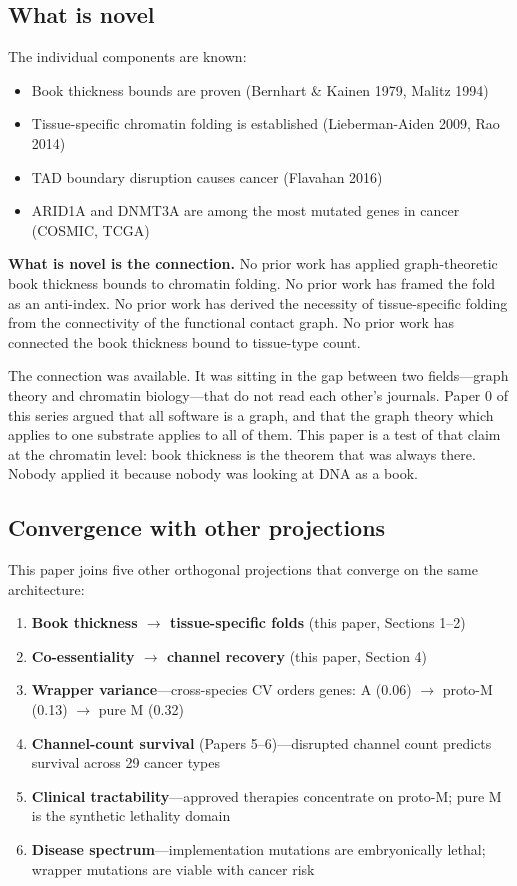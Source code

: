 \documentclass[11pt]{article}
\theoremstyle{definition}
\begin{document}
\subsection{What is novel}

The individual components are known:
\begin{itemize}[nosep]
\item Book thickness bounds are proven (Bernhart \& Kainen 1979, Malitz 1994)
\item Tissue-specific chromatin folding is established (Lieberman-Aiden 2009, Rao 2014)
\item TAD boundary disruption causes cancer (Flavahan 2016)
\item ARID1A and DNMT3A are among the most mutated genes in cancer (COSMIC, TCGA)
\end{itemize}

\textbf{What is novel is the connection.} No prior work has applied graph-theoretic book thickness bounds to chromatin folding. No prior work has framed the fold as an anti-index. No prior work has derived the necessity of tissue-specific folding from the connectivity of the functional contact graph. No prior work has connected the book thickness bound to tissue-type count.

The connection was available. It was sitting in the gap between two fields---graph theory and chromatin biology---that do not read each other's journals. Paper 0 of this series argued that all software is a graph, and that the graph theory which applies to one substrate applies to all of them. This paper is a test of that claim at the chromatin level: book thickness is the theorem that was always there. Nobody applied it because nobody was looking at DNA as a book.

\subsection{Convergence with other projections}

This paper joins five other orthogonal projections that converge on the same architecture:

\begin{enumerate}[nosep]
\item \textbf{Book thickness $\to$ tissue-specific folds} (this paper, Sections 1--2)
\item \textbf{Co-essentiality $\to$ channel recovery} (this paper, Section 4)
\item \textbf{Wrapper variance}---cross-species CV orders genes: A (0.06) $\to$ proto-M (0.13) $\to$ pure M (0.32)
\item \textbf{Channel-count survival} (Papers 5--6)---disrupted channel count predicts survival across 29 cancer types
\item \textbf{Clinical tractability}---approved therapies concentrate on proto-M; pure M is the synthetic lethality domain
\item \textbf{Disease spectrum}---implementation mutations are embryonically lethal; wrapper mutations are viable with cancer risk
\end{enumerate}
\end{document}
